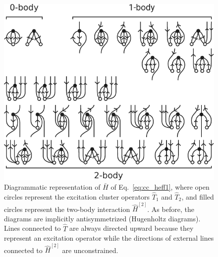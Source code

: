 \begin{figure}
  \includegraphics{fig-diagrams-ccsd.pdf}
  \caption{Diagrammatic representation of $\bar{H}$ of Eq.\ \eqref{eq:cc_heff1}, where open circles represent the excitation cluster operators $\hat{T}_1$ and $\hat{T}_2$, and filled circles represent the two-body interaction $\hat{H}^{[2]}$.  As before, the diagrams are implicitly antisymmetrized (Hugenholtz diagrams).  Lines connected to $\hat{T}$ are always directed upward because they represent an excitation operator while the directions of external lines connected to $\hat{H}^{[2]}$ are unconstrained.}
  \label{fig:diagrams-ccsd}
\end{figure}

